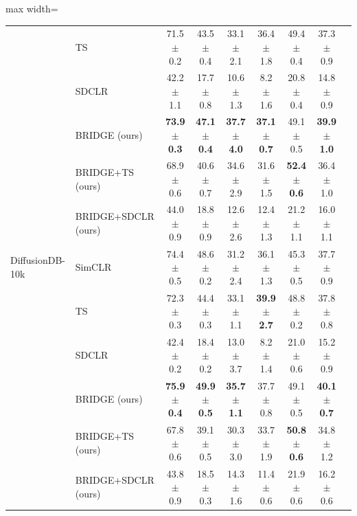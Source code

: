 \begin{table}[t]
\begin{adjustbox}{max width=\textwidth}
\begin{tabular}{l l c c c c c c c}
 & TS & 71.5 {\scriptsize$\pm$ 0.2} & 43.5 {\scriptsize$\pm$ 0.4} & 33.1 {\scriptsize$\pm$ 2.1} & 36.4 {\scriptsize$\pm$ 1.8} & 49.4 {\scriptsize$\pm$ 0.4} & 37.3 {\scriptsize$\pm$ 0.9} \\
 & SDCLR & 42.2 {\scriptsize$\pm$ 1.1} & 17.7 {\scriptsize$\pm$ 0.8} & 10.6 {\scriptsize$\pm$ 1.3} & 8.2 {\scriptsize$\pm$ 1.6} & 20.8 {\scriptsize$\pm$ 0.4} & 14.8 {\scriptsize$\pm$ 0.9} \\
 & BRIDGE (ours) & \textbf{73.9 {\scriptsize$\pm$ 0.3}} & \textbf{47.1 {\scriptsize$\pm$ 0.4}} & \textbf{37.7 {\scriptsize$\pm$ 4.0}} & \textbf{37.1 {\scriptsize$\pm$ 0.7}} & 49.1 {\scriptsize$\pm$ 0.5} & \textbf{39.9 {\scriptsize$\pm$ 1.0}} \\
 & BRIDGE+TS (ours) & 68.9 {\scriptsize$\pm$ 0.6} & 40.6 {\scriptsize$\pm$ 0.7} & 34.6 {\scriptsize$\pm$ 2.9} & 31.6 {\scriptsize$\pm$ 1.5} & \textbf{52.4 {\scriptsize$\pm$ 0.6}} & 36.4 {\scriptsize$\pm$ 1.0} \\
 & BRIDGE+SDCLR (ours) & 44.0 {\scriptsize$\pm$ 0.9} & 18.8 {\scriptsize$\pm$ 0.9} & 12.6 {\scriptsize$\pm$ 2.6} & 12.4 {\scriptsize$\pm$ 1.3} & 21.2 {\scriptsize$\pm$ 1.1} & 16.0 {\scriptsize$\pm$ 1.1} \\
\midrule
DiffusionDB-10k & SimCLR & 74.4 {\scriptsize$\pm$ 0.5} & 48.6 {\scriptsize$\pm$ 0.2} & 31.2 {\scriptsize$\pm$ 2.4} & 36.1 {\scriptsize$\pm$ 1.3} & 45.3 {\scriptsize$\pm$ 0.5} & 37.7 {\scriptsize$\pm$ 0.9} \\
 & TS & 72.3 {\scriptsize$\pm$ 0.3} & 44.4 {\scriptsize$\pm$ 0.3} & 33.1 {\scriptsize$\pm$ 1.1} & \textbf{39.9 {\scriptsize$\pm$ 2.7}} & 48.8 {\scriptsize$\pm$ 0.2} & 37.8 {\scriptsize$\pm$ 0.8} \\
 & SDCLR & 42.4 {\scriptsize$\pm$ 0.2} & 18.4 {\scriptsize$\pm$ 0.2} & 13.0 {\scriptsize$\pm$ 3.7} & 8.2 {\scriptsize$\pm$ 1.4} & 21.0 {\scriptsize$\pm$ 0.6} & 15.2 {\scriptsize$\pm$ 0.9} \\
 & BRIDGE (ours) & \textbf{75.9 {\scriptsize$\pm$ 0.4}} & \textbf{49.9 {\scriptsize$\pm$ 0.5}} & \textbf{35.7 {\scriptsize$\pm$ 1.1}} & 37.7 {\scriptsize$\pm$ 0.8} & 49.1 {\scriptsize$\pm$ 0.5} & \textbf{40.1 {\scriptsize$\pm$ 0.7}} \\
 & BRIDGE+TS (ours) & 67.8 {\scriptsize$\pm$ 0.6} & 39.1 {\scriptsize$\pm$ 0.5} & 30.3 {\scriptsize$\pm$ 3.0} & 33.7 {\scriptsize$\pm$ 1.9} & \textbf{50.8 {\scriptsize$\pm$ 0.6}} & 34.8 {\scriptsize$\pm$ 1.2} \\
 & BRIDGE+SDCLR (ours) & 43.8 {\scriptsize$\pm$ 0.9} & 18.5 {\scriptsize$\pm$ 0.3} & 14.3 {\scriptsize$\pm$ 1.6} & 11.4 {\scriptsize$\pm$ 0.6} & 21.9 {\scriptsize$\pm$ 0.6} & 16.2 {\scriptsize$\pm$ 0.6} \\
\bottomrule
\end{tabular}
\end{adjustbox}
\end{table}
